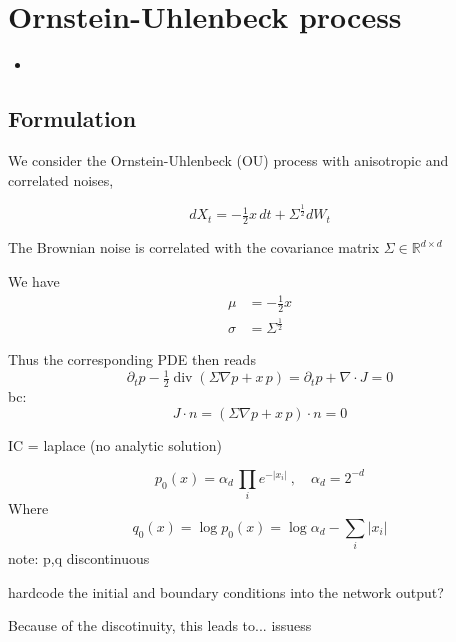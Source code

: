 
\chapter{Ornstein-Uhlenbeck process}

{
\color{red}
\begin{itemize}
\item 
\end{itemize}

}

\section{Formulation}


We consider the Ornstein-Uhlenbeck (OU) process with anisotropic and correlated noises, 

$$
dX_t = -\tfrac{1}{2} x\,dt + \Sigma^\frac{1}{2} dW_t
$$

The Brownian noise is correlated with the covariance matrix $\Sigma\in\mathbb{R}^{d\times d}$

We have
\begin{align*}
\mu &= -\tfrac{1}{2} x \\ 
\sigma &= \Sigma^\frac{1}{2}
\end{align*}

Thus the corresponding PDE then reads
\begin{equation*}
\partial_t p - \tfrac{1}{2} \operatorname{div}(\Sigma\nabla p + x\,p) =
\partial_t p + \nabla\cdot J = 0
\end{equation*}
bc:
\begin{equation*}
J\cdot n = 
(\Sigma\nabla p + x\,p)\cdot n = 0
\end{equation*}


IC = laplace (no analytic solution)

$$
p_0(x) = \alpha_d\,  \prod_i e^{-|x_i|}\:, \quad \alpha_d = 2^{-d}
$$
Where
$$
q_0(x) = \log p_0(x) = \log \alpha_d - \sum_i |x_i|
$$
note: p,q discontinuous 

hardcode the initial and boundary conditions into the network output?

Because of the discotinuity, this leads to... issuess

